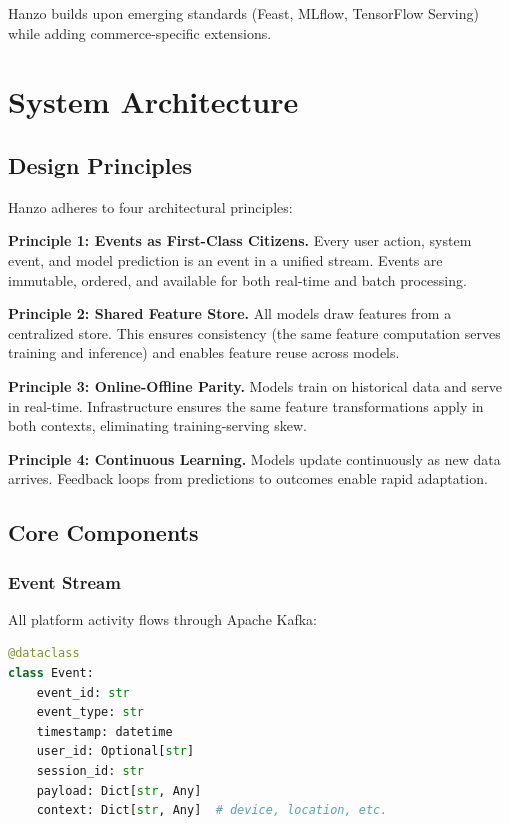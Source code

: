 \documentclass[11pt,twocolumn]{article}
\begin{document}
Hanzo builds upon emerging standards (Feast, MLflow, TensorFlow Serving) while adding commerce-specific extensions.

\section{System Architecture}

\subsection{Design Principles}

Hanzo adheres to four architectural principles:

\textbf{Principle 1: Events as First-Class Citizens.} Every user action, system event, and model prediction is an event in a unified stream. Events are immutable, ordered, and available for both real-time and batch processing.

\textbf{Principle 2: Shared Feature Store.} All models draw features from a centralized store. This ensures consistency (the same feature computation serves training and inference) and enables feature reuse across models.

\textbf{Principle 3: Online-Offline Parity.} Models train on historical data and serve in real-time. Infrastructure ensures the same feature transformations apply in both contexts, eliminating training-serving skew.

\textbf{Principle 4: Continuous Learning.} Models update continuously as new data arrives. Feedback loops from predictions to outcomes enable rapid adaptation.

\subsection{Core Components}

\subsubsection{Event Stream}

All platform activity flows through Apache Kafka:

\begin{lstlisting}[language=Python,caption=Event schema]
@dataclass
class Event:
    event_id: str
    event_type: str
    timestamp: datetime
    user_id: Optional[str]
    session_id: str
    payload: Dict[str, Any]
    context: Dict[str, Any]  # device, location, etc.
\end{lstlisting}
\end{document}
